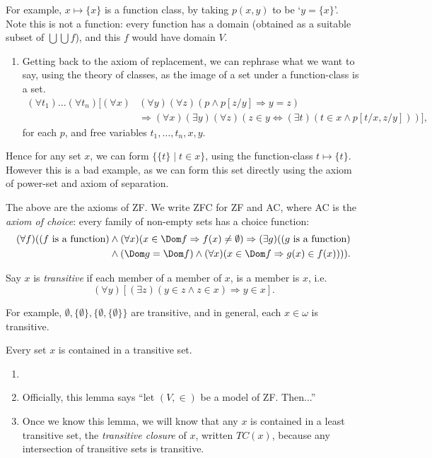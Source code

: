 \documentclass[12pt]{article}
\begin{document}
For example, $x \mapsto \{x\}$ is a function class, by taking $p(x, y)$ to be `$y = \{x\}$'. Note this is not a function: every function has a domain (obtained as a suitable subset of $\bigcup \bigcup f$), and this $f$ would have domain $V$.
\begin{enumerate}[resume]
	\item[]
	Getting back to the axiom of replacement, we can rephrase what we want to say, using the theory of classes, as the image of a set under a function-class is a set.
	\begin{align*}
		(\forall t_1) \ldots (\forall t_n) [(\forall x)&(\forall y)(\forall z)(p \wedge p[z/y] \Rightarrow y = z) \\
							       &\Rightarrow (\forall x)(\exists y)(\forall z)(z \in y \iff (\exists t)(t \in x \wedge p[t/x,z/y]))],
	\end{align*}
	for each $p$, and free variables $t_1, \ldots, t_n, x, y$.
\end{enumerate}
Hence for any set $x$, we can form $\{\{t\} \mid t \in x\}$, using the function-class $t \mapsto \{t\}$. However this is a bad example, as we can form this set directly using the axiom of power-set and axiom of separation.

The above are the axioms of ZF. We write ZFC for ZF and AC, where AC is the \emph{axiom of choice}: every family of non-empty sets has a choice function:
\begin{align*}
	(\forall f)((f \text{ is a function}) &\wedge (\forall x)(x \in \Dom f \Rightarrow f(x) \neq \emptyset) \Rightarrow (\exists g)((g \text { is a function}) \\
					     &\wedge (\Dom g = \Dom f) \wedge (\forall x)(x \in \Dom f \Rightarrow g(x) \in f(x)))).
\end{align*}

Say $x$ is \emph{transitive} if each member of a member of $x$, is a member is $x$, i.e.
\[
	(\forall y)[(\exists z)(y \in z \wedge z \in x) \Rightarrow y \in x].
\]

For example, $\emptyset, \{\emptyset\}, \{\emptyset,  \{\emptyset\}\}$ are transitive, and in general, each $x \in \omega$ is transitive.

\begin{lemma}
	Every set $x$ is contained in a transitive set.
\end{lemma}

\begin{remark}
	\begin{enumerate}
		\item[]
		\item Officially, this lemma says ``let $(V, \in)$ be a model of ZF. Then...''
		\item Once we know this lemma, we will know that any $x$ is contained in a least transitive set, the \emph{transitive closure} of $x$, written $TC(x)$, because any intersection of transitive sets is transitive.
	\end{enumerate}
\end{remark}
\end{document}
